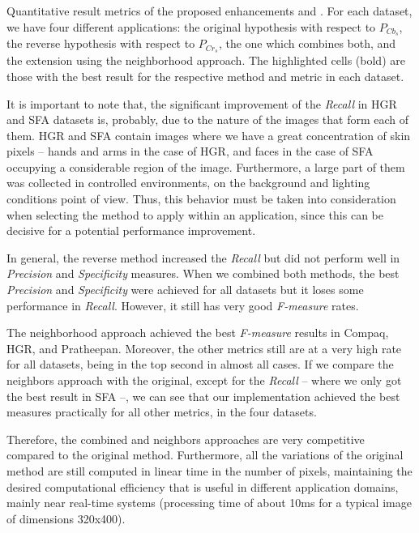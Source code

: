 \begin{table*}[ht]
\caption[Quantitative result metrics of the proposed enhancements and original method]{Quantitative result metrics of the proposed enhancements and \citet{brancati:17}. For each dataset, we have four different applications: the original hypothesis with respect to $P_{Cb_{s}}$, the reverse hypothesis with respect to $P_{Cr_{s}}$, the one which combines both, and the extension using the neighborhood approach. The highlighted cells (bold) are those with the best result for the respective method and metric in each dataset.}
\label{tab:merged_rules_results}

\end{table*}

It is important to note that, the significant improvement of the \textit{Recall} in HGR and SFA datasets is, probably, due to the nature of the images that form each of them. HGR and SFA contain images where we have a great concentration of skin pixels -- hands and arms in the case of HGR, and faces in the case of SFA occupying a considerable region of the image. Furthermore, a large part of them was collected in controlled environments, on the background and lighting conditions point of view. Thus, this behavior must be taken into consideration when selecting the method to apply within an application, since this can be decisive for a potential performance improvement.

In general, the reverse method increased the \textit{Recall} but did not perform well in \textit{Precision} and \textit{Specificity} measures. When we combined both methods, the best \textit{Precision} and \textit{Specificity} were achieved for all datasets but it loses some performance in \textit{Recall}. However, it still has very good \textit{F-measure} rates.

The neighborhood approach achieved the best \textit{F-measure} results in Compaq, HGR, and Pratheepan. Moreover, the other metrics still are at a very high rate for all datasets, being in the top second in almost all cases. If we compare the neighbors approach with the original, except for the \textit{Recall} -- where we only got the best result in SFA --, we can see that our implementation achieved the best measures practically for all other metrics, in the four datasets.

Therefore, the combined and neighbors approaches are very competitive compared to the original method. Furthermore, all the variations of the original method are still computed in linear time in the number of pixels, maintaining the desired computational efficiency that is useful in different application domains, mainly near real-time systems (processing time of about 10ms for a typical image of dimensions 320x400).


